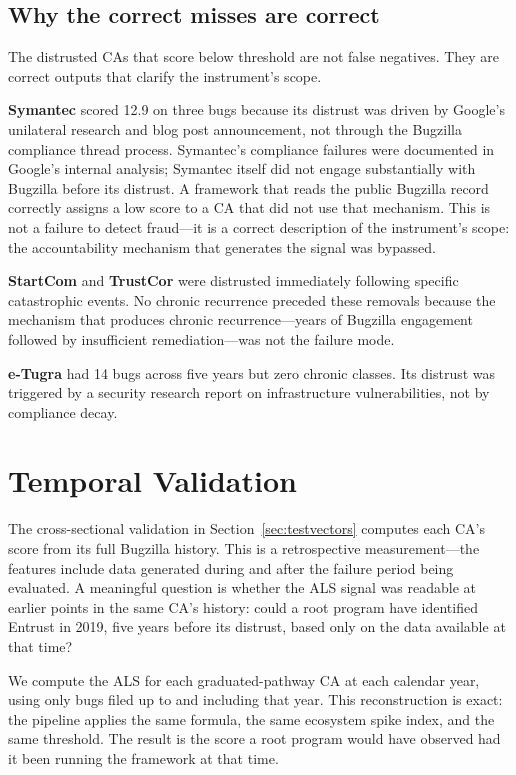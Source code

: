 \documentclass[10pt,twocolumn,letterpaper]{article}
\begin{document}
\subsection{Why the correct misses are correct}

The distrusted CAs that score below threshold are not false negatives. They are correct
outputs that clarify the instrument's scope.

\textbf{Symantec} scored 12.9 on three bugs because its distrust was driven by Google's
unilateral research and blog post announcement, not through the Bugzilla compliance thread
process. Symantec's compliance failures were documented in Google's internal analysis;
Symantec itself did not engage substantially with Bugzilla before its distrust. A
framework that reads the public Bugzilla record correctly assigns a low score to a CA
that did not use that mechanism. This is not a failure to detect fraud---it is a correct
description of the instrument's scope: the accountability mechanism that generates the
signal was bypassed.

\textbf{StartCom} and \textbf{TrustCor} were distrusted immediately following specific
catastrophic events. No chronic recurrence preceded these removals because the mechanism
that produces chronic recurrence---years of Bugzilla engagement followed by insufficient
remediation---was not the failure mode.

\textbf{e-Tugra} had 14 bugs across five years but zero chronic classes. Its distrust
was triggered by a security research report on infrastructure vulnerabilities, not by
compliance decay.

\section{Temporal Validation}
\label{sec:temporal}

The cross-sectional validation in Section~\ref{sec:testvectors} computes each CA's
score from its full Bugzilla history. This is a retrospective measurement---the features
include data generated during and after the failure period being evaluated. A meaningful
question is whether the ALS signal was readable at earlier points in the same CA's
history: could a root program have identified Entrust in 2019, five years before its
distrust, based only on the data available at that time?

We compute the ALS for each graduated-pathway CA at each calendar year, using only bugs
filed up to and including that year. This reconstruction is exact: the pipeline applies
the same formula, the same ecosystem spike index, and the same threshold. The result is
the score a root program would have observed had it been running the framework at that
time.
\end{document}
